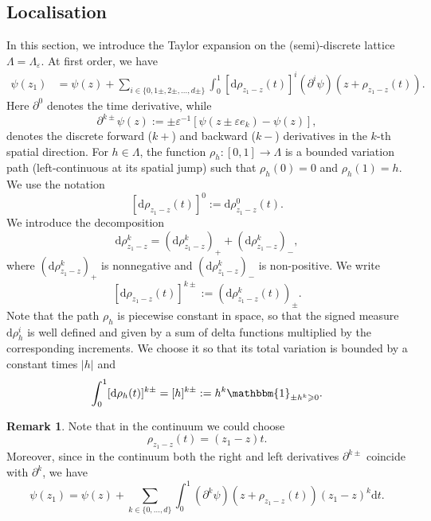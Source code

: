 \documentclass{article}
\numberwithin{equation}{section}
\newcommand{\assign}{:=}
\newcommand{\mathd}{\mathrm{d}}
\theoremstyle{plain}
\theoremstyle{definition}
\newtheorem{remark}[theorem]{Remark}
\begin{document}
\subsection{Localisation}\label{app:localization}

In this section, we introduce the Taylor expansion on the (semi)-discrete
lattice $\Lambda = \Lambda_{\varepsilon}$. At first order, we have
\[ \begin{aligned}
     \psi (z_1) & =  \psi (z) + \sum_{i \in \{ 0, 1 \pm, 2 \pm, \ldots, d \pm
     \}} \int_0^1 [\mathd \rho _{z_1 - z} (t)]^i  (\partial^i \psi) (z +
     \rho_{z_1 - z} (t)).
   \end{aligned} \]
Here $\partial^0$ denotes the time derivative, while
\[ \partial^{k\pm} \psi (z) \assign \pm \varepsilon^{- 1} [\psi (z \pm \varepsilon e_k) -
   \psi (z)], \]
denotes the discrete forward ($k +$) and backward ($k -$) derivatives in the
$k$-th spatial direction. For $h \in \Lambda$, the function $\rho_h : [0, 1]
\rightarrow \Lambda$ is a bounded variation path (left-continuous at its spatial jump) such that $\rho_h (0) = 0$
and $\rho_h (1) = h$. We use the notation 
\[
[\mathd \rho_{z_1 - z} (t)]^0
\assign \mathd \rho_{z_1 - z}^0 (t).
\]
We introduce the decomposition
\[
\mathd\rho_{z_1-z}^k=(\mathd\rho_{z_1-z}^k)_++(\mathd\rho_{z_1-z}^k)_-,
\]
where $(\mathd\rho_{z_1-z}^k)_+$ is nonnegative and
$(\mathd\rho_{z_1-z}^k)_-$ is non-positive. We write
\[
[\mathd \rho_{z_1 - z} (t)]^{k \pm}
\assign (\mathd \rho_{z_1 - z}^k (t))_{\pm}.
\]
Note that the path $\rho_h$ is piecewise
constant in space, so that the signed measure $\mathd \rho_h^i$ is well
defined and given by a sum of delta functions multiplied by the corresponding
increments. We choose it so that its total variation is bounded by a constant times $| h | $ and
\[ \int_0^1 [\mathd \rho_h (t)]^{k \pm} = [h]^{k \pm} \assign h^k
   \mathbbm{1}_{\pm h^k \geqslant 0} . \]
\begin{remark}
  Note that in the continuum we could choose
  \[ \rho_{z_1 - z} (t) = (z_1 - z) t. \]
  Moreover, since in the continuum both the right and left derivatives
  $\partial^{k\pm}$ coincide with $\partial^k$, we have
  \[ \psi (z_1) = \psi (z) + \sum_{k \in \{ 0, \ldots, d \}} \int_0^1
     (\partial^k \psi) (z + \rho_{z_1 - z} (t))  (z_1 - z)^k \mathd t. \]
\end{remark}
\end{document}
